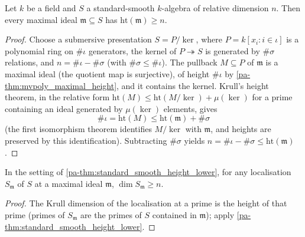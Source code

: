 \begin{theorem}
  \label{pa-thm:standard_smooth_height_lower}
  \leanok

  Let \(k\) be a field and \(S\) a standard-smooth \(k\)-algebra of relative dimension
  \(n\). Then every maximal ideal \(\mathfrak m \subseteq S\) has
  \(\mathrm{ht}(\mathfrak m) \geq n\).
\end{theorem}
\begin{proof}
  \leanok
  Choose a submersive presentation \(S = P/\ker\), where
  \(P = k[x_i : i \in \iota]\) is a polynomial ring on \(\#\iota\) generators, the
  kernel of \(P \twoheadrightarrow S\) is generated by \(\#\sigma\) relations, and
  \(n = \#\iota - \#\sigma\) (with \(\#\sigma \leq \#\iota\)). The pullback
  \(M \subseteq P\) of \(\mathfrak m\) is a maximal ideal (the quotient map is
  surjective), of height \(\#\iota\) by \ref{pa-thm:mvpoly_maximal_height}, and it contains
  the kernel. Krull's height theorem, in the relative form
  \(\mathrm{ht}(M) \leq \mathrm{ht}(M/\ker) + \mu(\ker)\) for a prime containing an
  ideal generated by \(\mu(\ker)\) elements, gives
  \[
    \#\iota = \mathrm{ht}(M) \leq \mathrm{ht}(\mathfrak m) + \#\sigma
  \]
  (the first isomorphism theorem identifies \(M/\ker\) with \(\mathfrak m\), and heights
  are preserved by this identification). Subtracting \(\#\sigma\) yields
  \(n = \#\iota - \#\sigma \leq \mathrm{ht}(\mathfrak m)\).
\end{proof}

\begin{lemma}
  \label{pa-lem:standard_smooth_dim_lower_localized}
  \leanok

  In the setting of \ref{pa-thm:standard_smooth_height_lower}, for any localisation
  \(S_{\mathfrak m}\) of \(S\) at a maximal ideal \(\mathfrak m\),
  \(\dim S_{\mathfrak m} \geq n\).
\end{lemma}
\begin{proof}
  \leanok
  The Krull dimension of the localisation at a prime is the height of that prime
  (primes of \(S_{\mathfrak m}\) are the primes of \(S\) contained in
  \(\mathfrak m\)); apply \ref{pa-thm:standard_smooth_height_lower}.
\end{proof}

